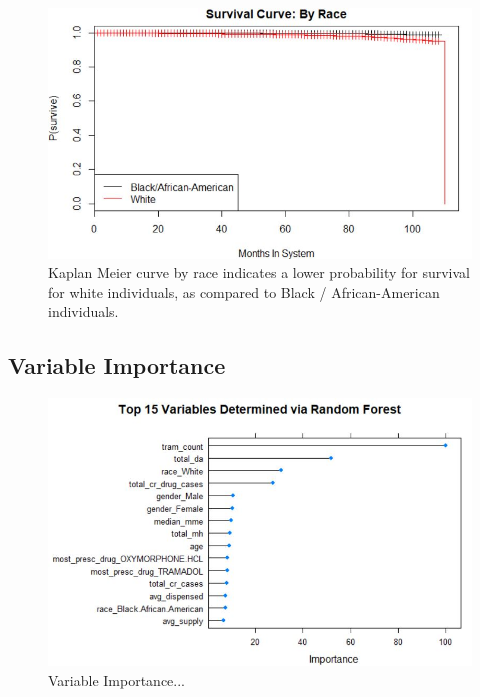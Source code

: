 \documentclass[twoside,10.5pt]{article}
\begin{document}
\begin{figure}[htp]
\centering
\includegraphics[width=12cm]{images/kaplan_meier_race.JPG}
\caption{Kaplan Meier curve by race indicates a lower probability for survival for white individuals, as compared to Black / African-American individuals. }
\label{fig:km_race}
\end{figure}

\subsection{Variable Importance}

\begin{figure}[htp]
\centering
\includegraphics[width=12cm]{images/variable_importance.JPG}
\caption{Variable Importance... }
\label{fig:var_importance}
\end{figure}
\end{document}

